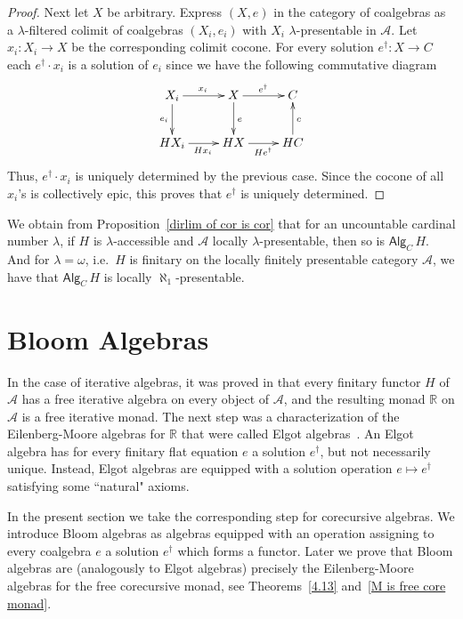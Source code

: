 \documentclass{LMCS}
\theoremstyle{plain}
\theoremstyle{definition}
\numberwithin{equation}{section}
\begin{document}
\begin{proof}
Next let $X$ be arbitrary. Express $(X,e)$ in the category of
coalgebras as a $\lambda$-filtered colimit of coalgebras $(X_i, e_i)$
with $X_i$ $\lambda$-presentable in $\mathcal A$. Let $x_i:X_i\rightarrow X$ be
the corresponding colimit cocone. For every solution
$e^\dagger:X\rightarrow C$ each $e^\dagger \cdot x_i$ is a solution of
$e_i$ since we have the following commutative diagram
$$
\xymatrix{
X_i\ar[r]^{x_i}\ar[d]_{e_i}&X\ar[r]^{e^\dagger}\ar[d]^e&C\\
HX_i\ar[r]_{Hx_i}&HX\ar[r]_{He^\dagger}&HC\ar[u]_c
}
$$
Thus, $e^\dagger \cdot x_i$ is uniquely determined by the previous case. Since the cocone of all $x_i$'s is collectively epic, this proves that $e^\dagger$ is uniquely determined.
\end{proof}

\begin{rem}
  We obtain from Proposition~\ref{dirlim of cor is cor} that for an uncountable cardinal number $\lambda$, if $H$ is $\lambda$-accessible and $\mathcal A$ locally $\lambda$-presentable, then so is $\mathsf{Alg}_C\, H$. And for $\lambda = \omega$, i.e.~$H$ is finitary on the locally finitely presentable category $\mathcal A$, we have that $\mathsf{Alg}_C\, H$ is locally $\aleph_1$-presentable.
\end{rem}







\section{Bloom Algebras}

In the case of iterative algebras, it was proved in \cite{amv_atwork}
that every finitary functor $H$ of $\mathcal A$ has a free iterative
algebra on every object of $\mathcal A$, and the resulting monad $\mathbb{R}$ on $\mathcal A$ is a
free iterative monad. The next step was a characterization of the
Eilenberg-Moore algebras for $\mathbb R$ that were called Elgot
algebras~\cite{amv3}. An Elgot algebra has for every finitary flat
equation $e$ a solution $e^\dagger$, but not necessarily
unique. Instead, Elgot algebras are equipped with a solution operation
$e\mapsto e^\dagger$ satisfying some ``natural" axioms.

In the present section we take the corresponding step for corecursive algebras. We introduce Bloom algebras as algebras equipped with an operation assigning to every coalgebra $e$ a solution $e^\dagger$ which forms a functor. Later we prove that Bloom algebras are (analogously to Elgot algebras) precisely the Eilenberg-Moore algebras for the free corecursive monad, see Theorems~\ref{4.13} and~\ref{M is free core monad}.
\end{document}
